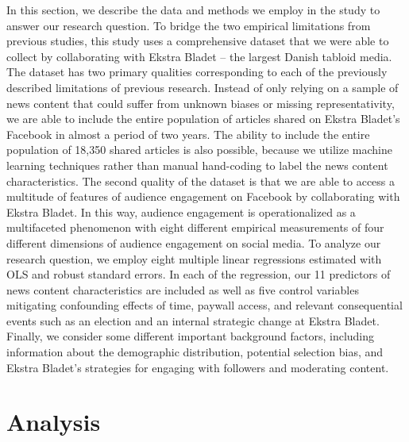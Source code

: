 \documentclass[
]{article}
\begin{document}
In this section, we describe the data and methods we employ in the study
to answer our research question. To bridge the two empirical limitations
from previous studies, this study uses a comprehensive dataset that we
were able to collect by collaborating with Ekstra Bladet -- the largest
Danish tabloid media. The dataset has two primary qualities
corresponding to each of the previously described limitations of
previous research. Instead of only relying on a sample of news content
that could suffer from unknown biases or missing representativity, we
are able to include the entire population of articles shared on Ekstra
Bladet's Facebook in almost a period of two years. The ability to
include the entire population of 18,350 shared articles is also
possible, because we utilize machine learning techniques rather than
manual hand-coding to label the news content characteristics. The second
quality of the dataset is that we are able to access a multitude of
features of audience engagement on Facebook by collaborating with Ekstra
Bladet. In this way, audience engagement is operationalized as a
multifaceted phenomenon with eight different empirical measurements of
four different dimensions of audience engagement on social media. To
analyze our research question, we employ eight multiple linear
regressions estimated with OLS and robust standard errors. In each of
the regression, our 11 predictors of news content characteristics are
included as well as five control variables mitigating confounding
effects of time, paywall access, and relevant consequential events such
as an election and an internal strategic change at Ekstra Bladet.
Finally, we consider some different important background factors,
including information about the demographic distribution, potential
selection bias, and Ekstra Bladet's strategies for engaging with
followers and moderating content.

\pagebreak

\hypertarget{analysis}{%
\section{Analysis}\label{analysis}}
\end{document}
